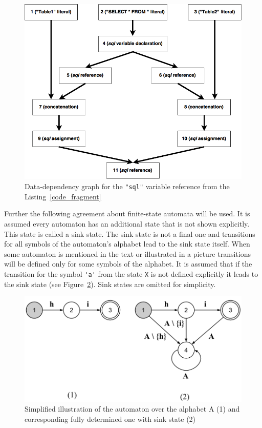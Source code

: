 \documentclass{sig-alternate-05-2015}
\begin{document}
\begin{figure}[h!]
    \begin{center}
        \includegraphics[scale=0.3]{Figures/Dependency_graph.png}
    \end{center}
    \caption{Data-dependency graph for the \texttt{"sql"} variable reference from the Listing~\ref{code_fragment}}
    \label{data_dependency_pic}
\end{figure} 

Further the following agreement about finite-state automata will be used. It is assumed every automaton has an additional state that is not shown explicitly. This state is called a sink state. The sink state is not a final one and transitions for all symbols of the automaton's alphabet lead to the sink state itself. When some automaton is mentioned in the text or illustrated in a picture transitions will be defined only for some symbols of the alphabet. It is assumed that if the transition for the symbol  \verb|'a'| from the state \verb|X| is not defined explicitly it leads to the sink state (see Figure~\ref{hi_pic}). Sink states are omitted for simplicity.

\begin{figure}[h!]
    \begin{center}
        \includegraphics[scale=0.3]{Figures/automaton_with_sink.png}
    \end{center}
    \caption{Simplified illustration of the automaton over the alphabet A (1) and corresponding fully determined one with sink state (2)}
    \label{hi_pic}
\end{figure} 
\end{document}
